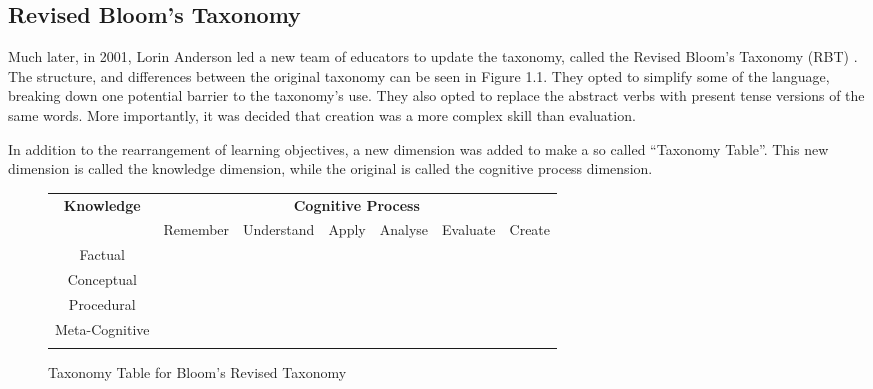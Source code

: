 \subsection{Revised Bloom's Taxonomy}

Much later, in 2001, Lorin Anderson led a new team of educators to update the taxonomy, called the Revised Bloom's Taxonomy (RBT) \cite{revised-blooms-taxonomy}. The structure, and differences between the original taxonomy can be seen in Figure 1.1. They opted to simplify some of the language, breaking down one potential barrier to the taxonomy's use. They also opted to replace the abstract verbs with present tense versions of the same words. More importantly, it was decided that creation was a more complex skill than evaluation.

In addition to the rearrangement of learning objectives, a new dimension was added to make a so called ``Taxonomy Table''. This new dimension is called the knowledge dimension, while the original is called the cognitive process dimension. \newline


\begin{figure}[h]
\begin{center}
\begin{tabular}{|c|c|c|c|c|c|c|}
\hline
\multirow{2}{*}{\textbf{Knowledge}}& \multicolumn{6}{c|}{\textbf{Cognitive Process}}  \\ \cline{2-7}
& Remember & Understand & Apply & Analyse & Evaluate &  Create \\ \hline 
Factual & \cellcolor{Gray9} & \cellcolor{Gray8} & \cellcolor{Gray7} & \cellcolor{Gray6} & \cellcolor{Gray5} & \cellcolor{Gray4} \\ \hhline{*7-}
Conceptual & \cellcolor{Gray8} & \cellcolor{Gray7} & \cellcolor{Gray6} & \cellcolor{Gray5} & \cellcolor{Gray4} & \cellcolor{Gray3}  \\ \hhline{*7-}
Procedural & \cellcolor{Gray7} & \cellcolor{Gray6} & \cellcolor{Gray5} & \cellcolor{Gray4} & \cellcolor{Gray3} & \cellcolor{Gray2} \\ \hhline{*7-}
Meta-Cognitive & \cellcolor{Gray6} &\cellcolor{Gray5} &\cellcolor{Gray4} &\cellcolor{Gray3} & \cellcolor{Gray2} & \cellcolor{Gray1} \\ \hhline{*7-}
\end{tabular}\caption{Taxonomy Table for Bloom's Revised Taxonomy}\label{fig:brt}
\end{center}
\end{figure}

